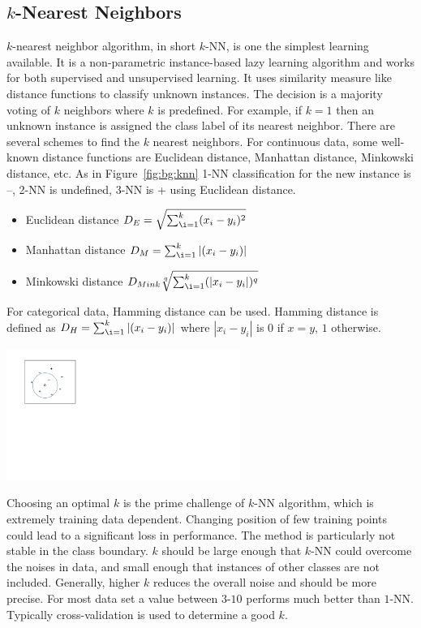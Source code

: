 \subsection*{$k$-Nearest Neighbors}
$k$-nearest neighbor algorithm, in short $k$-NN, is one the simplest learning available. It is a non-parametric instance-based lazy learning algorithm and works for both supervised and unsupervised learning. It uses similarity measure like distance functions to classify unknown instances. The decision is a majority voting of  $k$ neighbors where $k$ is predefined. For example, if $k= 1$ then an unknown instance is assigned the class label of its nearest neighbor. There are several schemes to find the $k$ nearest neighbors. For continuous data, some well-known distance functions are Euclidean distance, Manhattan distance, Minkowski distance, etc.  As in Figure~\ref{fig:bg:knn} 1-NN classification for the new instance is {--}, 2-NN is undefined, 3-NN is {+} using Euclidean distance.
\begin{itemize}
    \item Euclidean distance $D_E = \sqrt{\sum_{\i =1 }^{k} (x_i - y_i)^2}$
    \item Manhattan distance $D_M = \sum_{\i =1 }^{k} |(x_i - y_i)|$
    \item Minkowski distance $D_{Mink}\sqrt[q]{\sum_{\i =1 }^{k} (|x_i - y_i|)^q}$
\end{itemize}
For categorical data, Hamming distance can be used. Hamming distance is defined as $D_H = \sum_{\i =1 }^{k} |(x_i - y_i)|$ where $|x_i - y_i|$ is $0$ if $x=y$, $1$ otherwise.

    \begin{center}
        \includegraphics[width=3.0in]{figs/knn.pdf}
        \label{fig:bg:knn}
    \end{center}

Choosing an optimal $k$ is the prime challenge of $k$-NN algorithm, which is extremely training data dependent. Changing position of few training points could lead to a significant loss in performance. The method is particularly not stable in the class boundary. $k$ should be large enough that $k$-NN could overcome the noises in data, and small enough that instances of other classes are not included. Generally, higher $k$ reduces the overall noise and should be more precise. For most data set a value between $3$-$10$ performs much better than $1$-NN. Typically cross-validation is used to determine a good $k$. 

